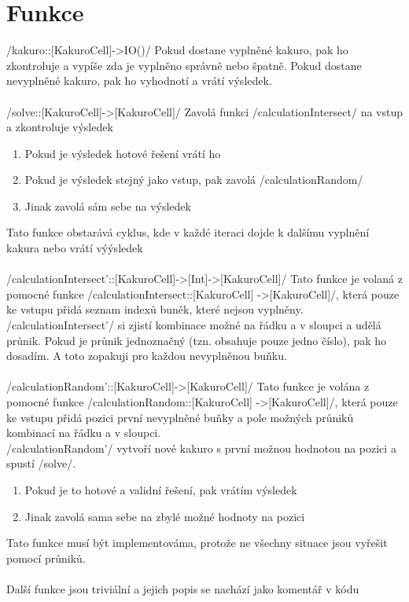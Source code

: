 \section*{Funkce}

\haskell/kakuro::[KakuroCell]->IO()/
Pokud dostane vyplněné kakuro, pak ho zkontroluje a vypíše zda je vyplněno správně nebo špatně.
Pokud dostane nevyplněné kakuro, pak ho vyhodnotí a vrátí výsledek.
\\\\

\haskell/solve::[KakuroCell]->[KakuroCell]/
Zavolá funkci \haskellline/calculationIntersect/ na vstup a zkontroluje výsledek
\begin{enumerate}
\item Pokud je výsledek hotové řešení vrátí ho
\item Pokud je výsledek stejný jako vstup, pak zavolá \haskell/calculationRandom/
\item Jinak zavolá sám sebe na výsledek
\end{enumerate}
Tato funkce obstarává cyklus, kde v každé iteraci dojde k dalšímu vyplnění kakura nebo vrátí výýsledek
\\\\

\haskell/calculationIntersect'::[KakuroCell]->[Int]->[KakuroCell]/
Tato funkce je volaná z pomocné funkce \haskellline/calculationIntersect::[KakuroCell] ->[KakuroCell]/, která pouze ke vstupu přidá seznam indexů buněk, které nejsou vyplněny.
\\
\haskellline/calculationIntersect'/ si zjistí kombinace možné na řádku a v sloupci a udělá průnik. 
Pokud je průnik jednoznačný (tzn. obsahuje pouze jedno číslo), pak ho dosadím.
A toto zopakuji pro každou nevyplněnou buňku.
\\\\

\haskell/calculationRandom'::[KakuroCell]->[KakuroCell]/
Tato funkce je volána z pomocné funkce \haskellline/calculationRandom::[KakuroCell] ->[KakuroCell]/, která pouze ke vstupu přidá pozici první nevyplněné buňky a pole možných průniků kombinací na řádku a v sloupci.
\\
\haskellline/calculationRandom'/ vytvoří nové kakuro s první možnou hodnotou na pozici a spustí \haskellline/solve/.
\begin{enumerate}
\item Pokud je to hotové a validní řešení, pak vrátím výsledek
\item Jinak zavolá sama sebe na zbylé možné hodnoty na pozici
\end{enumerate}
Tato funkce musí být implementováma, protože ne všechny situace jsou vyřešit pomocí průniků.
\\\\

Další funkce jsou triviální a jejich popis se nachází jako komentář v kódu